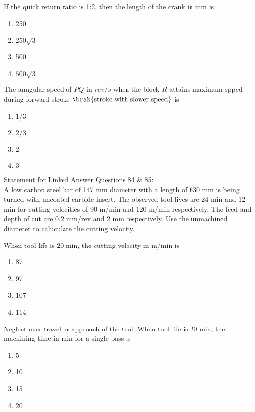 	\item If the quick return ratio is 1:2, then the length of the crank in mm is 
		\begin{enumerate}
			\item 250
			\item $250\sqrt{3}$
			\item 500
			\item $500\sqrt{3}$
		\end{enumerate}
	\item The anugular speed of $PQ$ in $rev/s$ when the block $R$ attains maximum spped during forward stroke $\brak{\text{stroke with slower speed}}$ is 
		\begin{enumerate}
			\item $1/3$
			\item $2/3$
			\item 2
			\item $3$
		\end{enumerate}
		Statement for Linked Answer Questions 84 \& 85: \\
		A low carbon steel bar of 147 mm diameter with a length of 630 mm is being turned with uncoated carbide insert. The observed tool lives are 24 min and 12 min for cutting velocities of 90 m/min and 120 m/min respectively. The feed and depth of cut are 0.2 mm/rev and 2 mm respectively. Use the unmachined diameter to caluculate the cutting velocity. 
	\item When tool life is 20 min, the cutting velocity in m/min is
		\begin{enumerate}
		\item 87
		\item 97
		\item 107
		\item 114
		\end{enumerate}
	\item Neglect over-travel or approach of the tool. When tool life is 20 min, the machining time in min for a single pass is 
		\begin{enumerate}
			\item 5
			\item 10
			\item 15
			\item 20
		\end{enumerate}




